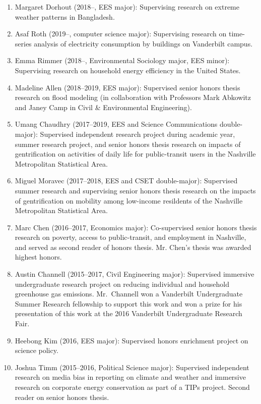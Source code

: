 \documentclass[10pt]{article}
\begin{document}
    \begin{enumerate}
    \item Margaret Dorhout (2018--, EES major): Supervising research on extreme weather patterns in Bangladesh.
    \item Asaf Roth (2019--, computer science major): Supervising research on time-series analysis of electricity consumption by buildings on Vanderbilt campus.
    \item Emma Rimmer (2018--, Environmental Sociology major, EES minor): Supervising research on household energy efficiency in the United States.
    \item Madeline Allen (2018--2019, EES major): Supervised senior honors thesis research on flood modeling (in collaboration with Professors Mark Abkowitz and Janey Camp in Civil \& Environmental Engineering).
    \item Umang Chaudhry (2017--2019, EES and Science Communications double-major): Supervised independent research project during academic year, summer research project, and senior honors thesis research on impacts of gentrification on activities of daily life
    for public-transit users in the Nashville Metropolitan Statistical Area.
    \item Miguel Moravec (2017--2018, EES and CSET double-major): Supervised summer research and supervising senior honors thesis research on the impacts of gentrification on mobility among low-income resildents of the Nashville Metropolitan Statistical Area.
    \item Marc Chen (2016--2017, Economics major): Co-supervised senior honors thesis research on poverty, access to public-transit, and employment in Nashville, and served as second reader of honors thesis. Mr. Chen's thesis was awarded highest honors.
    \item Austin Channell (2015--2017, Civil Engineering major): Supervised immersive undergraduate research project on reducing individual and household greenhouse gas emissions.
    Mr.~Channell won a Vanderbilt Undergraduate Summer Research fellowship to support this work and won a prize for his presentation of this work at the 2016 Vanderbilt Undergraduate Research Fair.
    \item Heebong Kim (2016, EES major): Supervised honors enrichment project on science policy.
    \item Joshua Timm (2015--2016, Political Science major): Supervised independent research on media bias in reporting on climate and weather and immersive research on corporate energy conservation as part of a TIPs project. Second reader on senior honors thesis.

\end{enumerate}
\end{document}
